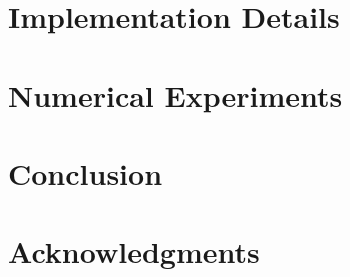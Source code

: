 \documentclass[3p, 11pt]{elsarticle}
\begin{document}
\section{Implementation Details}\label{section:implementation}


\section{Numerical Experiments}\label{section:numerical}


\section{Conclusion}\label{section:conclusion}

{\color{Brown}
\section{Acknowledgments}\label{section:acknowledgements}

}

\clearpage
	
	
\end{document}
